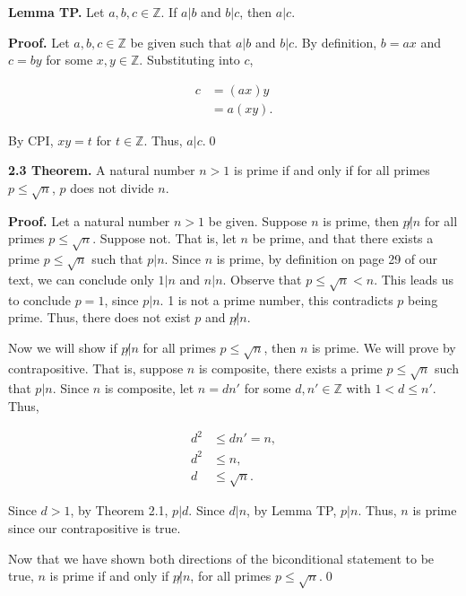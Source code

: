\documentclass[12pt]{article}
\begin{document}
\noindent\textbf{Lemma TP.} Let $a,b,c\in\mathbb{Z}$. If $a|b$ and $b|c$, then $a|c$.

\bigskip

\noindent\textbf{Proof.} Let $a,b,c\in\mathbb{Z}$ be given such that $a|b$ and $b|c$. By definition, $b=ax$ and $c=by$ for some $x,y\in\mathbb{Z}$. Substituting into $c$,

\begin{align*}
c &= (ax)y \\
&= a(xy).
\end{align*}

\noindent By CPI, $xy=t$ for $t\in\mathbb{Z}$. Thus, $a|c$.\qed

\bigskip

\noindent\textbf{2.3 Theorem.} A natural number $n>1$ is prime if and only if for all primes $p\leq \sqrt{n}$, $p$ does not divide $n$.

\bigskip

\noindent\textbf{Proof.} Let a natural number $n>1$ be given. Suppose $n$ is prime, then $p\not| n$ for all primes $p\leq \sqrt{n}$. Suppose not. That is, let $n$ be prime, and that there exists a prime $p\leq \sqrt{n}$ such that $p|n$. Since $n$ is prime, by definition on page 29 of our text, we can conclude only $1|n$ and $n|n$. Observe that $p\leq\sqrt{n}<n$. This leads us to conclude $p=1$, since $p|n$. 1 is not a prime number, this contradicts $p$ being prime. Thus, there does not exist $p$ and $p\not| n$.

\bigskip

\noindent Now we will show if $p\not| n$ for all primes $p\leq \sqrt{n}$, then $n$ is prime. We will prove by contrapositive. That is, suppose $n$ is composite, there exists a prime $p\leq \sqrt{n}$ such that $p|n$. Since $n$ is composite, let $n=dn'$ for some $d,n'\in\mathbb{Z}$ with $1<d\leq n'$. Thus,

\begin{align*}
d^2 &\leq dn' = n, \\
d^2 &\leq n, \\
d &\leq \sqrt{n}.
\end{align*}

\noindent Since $d>1$, by Theorem 2.1, $p|d$. Since $d|n$, by Lemma TP, $p|n$. Thus, $n$ is prime since our contrapositive is true.

\bigskip

\noindent Now that we have shown both directions of the biconditional statement to be true, $n$ is prime if and only if $p\not| n$, for all primes $p\leq \sqrt{n}$.\qed
\end{document}
